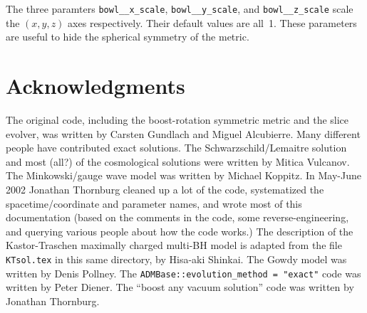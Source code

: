 The three paramters \verb|bowl__x_scale|, \verb|bowl__y_scale|, and
\verb|bowl__z_scale| scale the $(x,y,z)$ axes respectively.  Their
default values are all~1.  These parameters are useful to hide the
spherical symmetry of the metric.


\section{Acknowledgments}

The original code, including the boost-rotation symmetric metric
and the slice evolver, was written by Carsten Gundlach and Miguel Alcubierre.
Many different people have contributed exact solutions.
The Schwarzschild/Lemaitre solution
and most (all?) of the cosmological solutions
were written by Mitica Vulcanov.
The Minkowski/gauge wave model was written by Michael Koppitz.
In May-June 2002 Jonathan Thornburg cleaned up a lot of the code,
systematized the spacetime/coordinate and parameter names, and
wrote most of this documentation (based on the comments in the code,
some reverse-engineering, and querying various people about how the
code works.)
The description of the Kastor-Traschen maximally charged multi-BH
model is adapted from the file \verb|KTsol.tex| in this same directory,
by Hisa-aki Shinkai.
The Gowdy model was written by Denis Pollney.
The \verb|ADMBase::evolution_method = "exact"| code was written
by Peter Diener.
The ``boost any vacuum solution'' code was written by Jonathan Thornburg.




